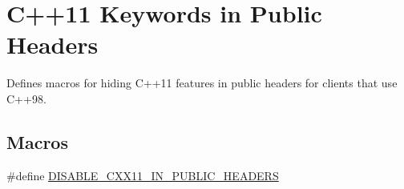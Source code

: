 \hypertarget{group__CXX11}{}\section{C++11 Keywords in Public Headers}
\label{group__CXX11}


Defines macros for hiding C++11 features in public headers for clients that use C++98.  


\subsection*{Macros}
\begin{DoxyCompactItemize}
\item 
\#define \hyperlink{group__CXX11_gac9170aec1e4d7357acfa6b9a2706d4af}{D\+I\+S\+A\+B\+L\+E\+\_\+\+C\+X\+X11\+\_\+\+I\+N\+\_\+\+P\+U\+B\+L\+I\+C\+\_\+\+H\+E\+A\+D\+E\+RS}\hypertarget{group__CXX11_gac9170aec1e4d7357acfa6b9a2706d4af}{}\label{group__CXX11_gac9170aec1e4d7357acfa6b9a2706d4af}


\end{DoxyCompactItemize}
